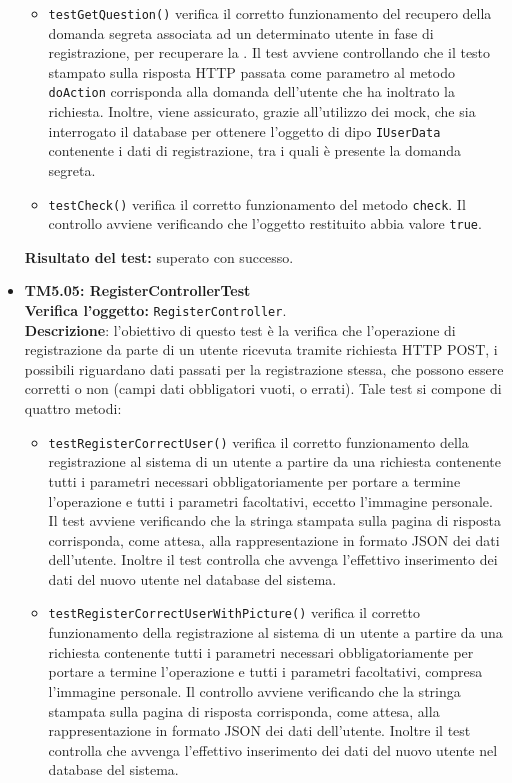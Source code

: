 \begin{itemize}
\begin{itemize}
\item \texttt{testGetQuestion()} verifica il corretto funzionamento del recupero della domanda segreta associata ad un determinato utente in fase di registrazione, per recuperare la .
Il test avviene controllando che il testo stampato sulla risposta HTTP passata come parametro al metodo \texttt{doAction} corrisponda alla domanda dell'utente che ha inoltrato la richiesta. Inoltre, viene assicurato, grazie all'utilizzo dei mock, che sia interrogato il database per ottenere l'oggetto di dipo \texttt{IUserData} contenente i dati di registrazione, tra i quali è presente la domanda segreta. 

\item \texttt{testCheck()} verifica il corretto funzionamento del metodo \texttt{check}. Il controllo avviene verificando che l'oggetto restituito abbia valore \texttt{true}.
 
\end{itemize}

\textbf{Risultato del test:} superato con successo.

\item \textbf{TM5.05: RegisterControllerTest}\\
\textbf{Verifica l'oggetto:} \texttt{RegisterController}.\\
\textbf{Descrizione}: l'obiettivo di questo test è la verifica che l'operazione di registrazione da parte di un utente ricevuta tramite richiesta HTTP POST, i possibili  riguardano dati passati per la registrazione stessa, che possono essere corretti o non (campi dati obbligatori vuoti, o errati).
Tale test si compone di quattro metodi:
\begin{itemize}
\item \texttt{testRegisterCorrectUser()} verifica il corretto funzionamento della registrazione al sistema di un utente a partire da una richiesta contenente tutti i parametri necessari obbligatoriamente per portare a termine l'operazione e tutti i parametri facoltativi, eccetto l'immagine personale. 
Il test avviene verificando che la stringa stampata sulla pagina di risposta corrisponda, come attesa, alla rappresentazione in formato JSON dei dati dell'utente. Inoltre il test controlla che avvenga l'effettivo inserimento dei dati del nuovo utente nel database del sistema.

\item \texttt{testRegisterCorrectUserWithPicture()}
verifica il corretto funzionamento della registrazione al sistema di un utente a partire da una richiesta contenente tutti i parametri necessari obbligatoriamente per portare a termine l'operazione e tutti i parametri facoltativi, compresa l'immagine personale. 
Il controllo avviene verificando che la stringa stampata sulla pagina di risposta corrisponda, come attesa, alla rappresentazione in formato JSON dei dati dell'utente. Inoltre il test controlla che avvenga l'effettivo inserimento dei dati del nuovo utente nel database del sistema.


\end{itemize}
\end{itemize}
